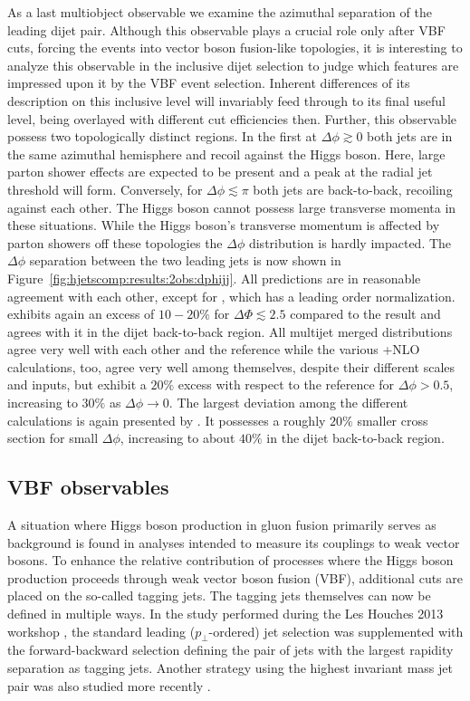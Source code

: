 As a last multiobject observable we examine the azimuthal separation of 
the leading dijet pair. Although this observable plays a crucial role 
only after VBF cuts, forcing the events into vector boson fusion-like 
topologies, it is interesting to analyze this observable in the 
inclusive dijet selection to judge which features are impressed upon 
it by the VBF event selection. Inherent differences of its description 
on this inclusive level will invariably feed through to its final 
useful level, being overlayed with different cut efficiencies then. 
Further, this observable possess two topologically distinct regions. In 
the first at $\Delta\phi\gtrsim 0$ both jets are in the same azimuthal 
hemisphere and recoil against the Higgs boson. Here, large parton shower 
effects are expected to be present and a peak at the radial jet threshold 
will form. Conversely, for $\Delta\phi\lesssim \pi$ both jets are 
back-to-back, recoiling against each other. The Higgs boson cannot possess 
large transverse momenta in these situations. While the Higgs boson's 
transverse momentum is affected by parton showers off these topologies 
the $\Delta\phi$ distribution is hardly impacted.
The $\Delta\phi$ separation between the two leading jets is now shown in
Figure~\ref{fig:hjetscomp:results:2obs:dphijj}. All predictions are
in reasonable agreement with each other, except for \Hej, which has a 
leading order normalization. \Sherpa \NNLOPS exhibits again an excess of 
$10-20\%$ for $\Delta\Phi\lesssim 2.5$ compared to the \Powheg \NNLOPS 
result and agrees with it in the dijet back-to-back region. All multijet 
merged distributions agree very well with each other and the reference 
while the various \GoSam{}+\Sherpa NLO calculations, too, agree very 
well among themselves, despite their different scales and inputs, but 
exhibit a $20\%$ excess with respect to the reference for $\Delta\phi>0.5$, 
increasing to $30\%$ as $\Delta\phi\to 0$. The largest deviation among 
the different calculations is again presented by \Hej. It possesses 
a roughly $20\%$ smaller cross section for small $\Delta\phi$, increasing 
to about $40\%$ in the dijet back-to-back region.



\clearpage
\subsection{VBF observables}
\label{sec:hjetscomp:results:VBFobs}

A situation where Higgs boson production in gluon fusion primarily
serves as background is found in analyses intended to measure its
couplings to weak vector bosons. To enhance the relative contribution
of processes where the Higgs boson production proceeds through weak
vector boson fusion (VBF), additional cuts are placed on the so-called
tagging jets. The tagging jets themselves can now be defined in
multiple ways. In the study performed during the Les Houches 2013
workshop \cite{AlcarazMaestre:2012vp}, the standard leading
($p_\perp$-ordered) jet selection was supplemented with the
forward-backward selection defining the pair of jets with the largest
rapidity separation as tagging jets. Another strategy using the
highest invariant mass jet pair was also studied more recently
\cite{Greiner:2015jha}.

